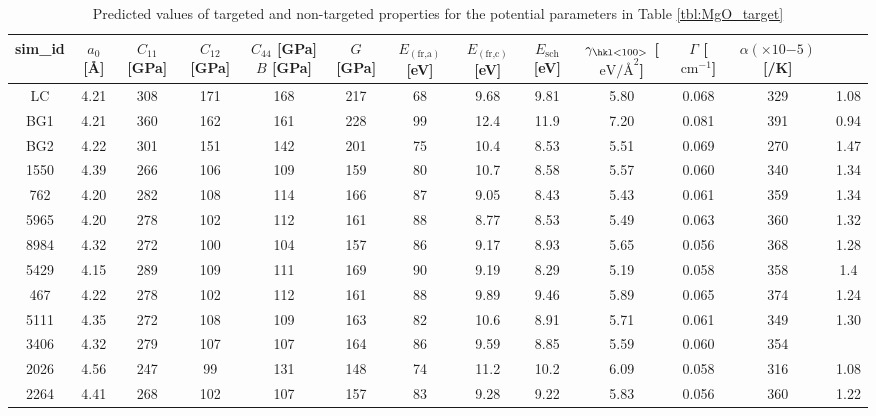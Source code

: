 \begin{table}[ht]
	\caption{Predicted values of targeted and non-targeted properties for the potential parameters in Table \ref{tbl:MgO_target}}
  \label{tbl:MgO_best_qoi}
	\centering
	\begin{tabular}{ccccccccccccc}
		\hline
	  sim\_id &	$a_0$ [\AA] & $C_{11}$ [GPa] & $C_{12}$ [GPa] & $C_{44}$ [GPa]
		$B$ [GPa] & $G$ [GPa] &	$E_(\text{fr,a})$ [eV] & $E_(\text{fr,c})$ [eV] &
		$E_{\text{sch}}$ [eV] & $\gamma_{\text{\hkl<100>}}$ [$\text{eV/\AA}^2$] &
		$\Gamma$ [$\text{cm}^{-1}$] & $\alpha(\times 10{-5})$ [/K] \\
	  \hline
		LC   & 4.21 & 308 & 171 & 168 & 217 & 68 & 9.68 & 9.81 & 5.80 & 0.068 &	329 & 1.08 \\
		BG1  & 4.21 & 360 & 162 & 161 & 228 & 99 & 12.4 & 11.9 & 7.20 & 0.081 & 391	& 0.94 \\
		BG2 & 4.22 & 301 & 151 & 142 & 201 & 75 & 10.4 & 8.53 & 5.51 & 0.069 & 270 & 1.47 \\
		1550 & 4.39 & 266 & 106 &	109 & 159 & 80 & 10.7 & 8.58 & 5.57 & 0.060 & 340	& 1.34 \\
		762 & 4.20 & 282 & 108 & 114 & 166 & 87 & 9.05 & 8.43 & 5.43 & 0.061 & 359 & 1.34 \\
		5965 & 4.20 & 278 & 102 & 112 & 161 & 88 & 8.77 & 8.53 & 5.49 & 0.063 & 360 & 1.32 \\
		8984 & 4.32 & 272 & 100 & 104 & 157 & 86 & 9.17 & 8.93 & 5.65 & 0.056 & 368 & 1.28 \\
		5429 & 4.15 & 289 & 109 & 111 & 169 & 90 & 9.19 & 8.29 & 5.19 & 0.058 & 358	& 1.4 \\
		467 & 4.22 & 278 & 102 & 112 & 161 & 88 & 9.89 & 9.46 & 5.89 & 0.065 & 374	& 1.24 \\
		5111 & 4.35 & 272 & 108 & 109 & 163 & 82 & 10.6 & 8.91 & 5.71 & 0.061 & 349 & 1.30 \\
		3406 & 4.32 & 279 & 107 & 107 & 164 & 86 & 9.59 & 8.85 & 5.59 & 0.060 & 354	 & \\
		2026 & 4.56 & 247 & 99 & 131 & 148 & 74 & 11.2 & 10.2 & 6.09 & 0.058 & 316 & 1.08 \\
		2264 & 4.41 & 268 & 102 & 107 & 157 & 83 & 9.28 & 9.22 & 5.83 & 0.056 & 360 & 1.22 \\
		\hline
	\end{tabular}
\end{table}

